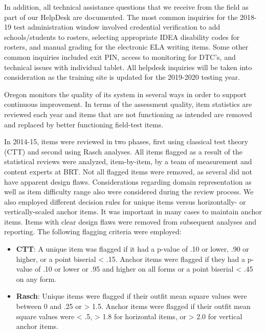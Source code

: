 \documentclass[]{article}
\providecommand{\tightlist}{%
  \setlength{\itemsep}{0pt}\setlength{\parskip}{0pt}}
\begin{document}
In addition, all technical assistance questions that we receive from the
field as part of our HelpDesk are documented. The most common inquiries
for the 2018-19 test administration window involved credential
verification to add schools/students to rosters, selecting appropriate
IDEA disability codes for rosters, and manual grading for the electronic
ELA writing items. Some other common inquiries included exit PIN, access
to monitoring for DTC's, and technical issues with individual tablet.
All helpdesk inquiries will be taken into consideration as the training
site is updated for the 2019-2020 testing year.

Oregon monitors the quality of its system in several ways in order to
support continuous improvement. In terms of the assessment quality, item
statistics are reviewed each year and items that are not functioning as
intended are removed and replaced by better functioning field-test
items.

In 2014-15, items were reviewed in two phases, first using classical
test theory (CTT) and second using Rasch analyses. All items flagged as
a result of the statistical reviews were analyzed, item-by-item, by a
team of measurement and content experts at BRT. Not all flagged items
were removed, as several did not have apparent design flaws.
Considerations regarding domain representation as well as item
difficulty range also were considered during the review process. We also
employed different decision rules for unique items versus horizontally-
or vertically-scaled anchor items. It was important in many cases to
maintain anchor items. Items with clear design flaws were removed from
subsequent analyses and reporting. The following flagging criteria were
employed:

\begin{itemize}
\tightlist
\item
  \textbf{CTT}: A unique item was flagged if it had a p-value of .10 or
  lower, .90 or higher, or a point biserial \textless{} .15. Anchor
  items were flagged if they had a p-value of .10 or lower or .95 and
  higher on all forms or a point biserial \textless{} .45 on any form.
\item
  \textbf{Rasch}: Unique items were flagged if their outfit mean square
  values were between 0 and .25 or \textgreater{} 1.5. Anchor items were
  flagged if their outfit mean square values were \textless{} .5,
  \textgreater{} 1.8 for horizontal items, or \textgreater{} 2.0 for
  vertical anchor items.
\end{itemize}
\end{document}
